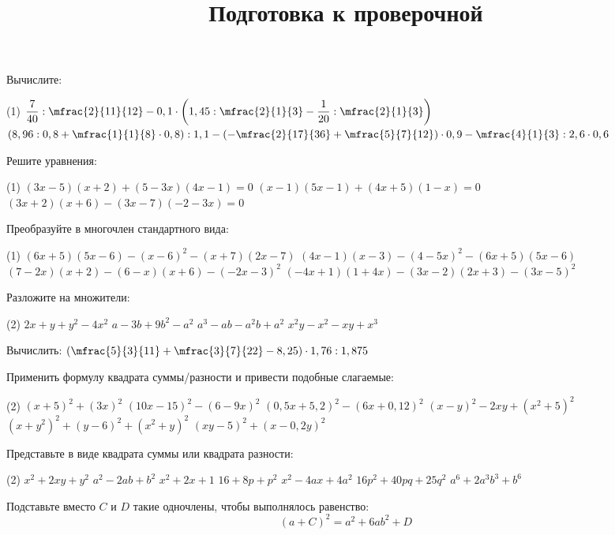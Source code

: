 \begin{class}[number=7]
	\title{Подготовка к проверочной}
	\begin{listofex}
		\item Вычислите:
		\begin{tasks}(1)
			\task \( \dfrac{7}{40} : \mfrac{2}{11}{12} - 0,1 \cdot \left( 1,45 : \mfrac{2}{1}{3} - \dfrac{1}{20} : \mfrac{2}{1}{3} \right) \)
			\task \( \left(  8,96 : 0,8 + \mfrac{1}{1}{8} \cdot 0,8 \right) : 1,1 - \left( - \mfrac{2}{17}{36} + \mfrac{5}{7}{12} \right) \cdot 0,9 - \mfrac{4}{1}{3} : 2,6 \cdot 0,6 \)
		\end{tasks}
		\item Решите уравнения:
		\begin{tasks}(1)
			\task \( (3x-5)(x+2)+(5-3x)(4x-1)=0 \)
			\task \( (x-1)(5x-1)+(4x+5)(1-x)=0 \)
			\task \( (3x+2)(x+6)-(3x-7)(-2-3x)=0 \)
		\end{tasks}
		\item Преобразуйте в многочлен стандартного вида:
		\begin{tasks}(1)
			\task \( (6x+5)(5x-6)-(x-6)^2-(x+7)(2x-7) \)
			\task \( (4x-1)(x-3)-(4-5x)^2-(6x+5)(5x-6) \)
			\task \( (7-2x)(x+2)-(6-x)(x+6)-(-2x-3)^2 \)
			\task \( (-4x+1)(1+4x)-(3x-2)(2x+3)-(3x-5)^2 \)
		\end{tasks}
		\item Разложите на множители:
		\begin{tasks}(2)
			\task \(2x+y+y^2-4x^2\)
			\task \(a-3b+9b^2-a^2\)
			\task \(a^3-ab-a^2b+a^2\)
			\task \(x^2y-x^2-xy+x^3\)
		\end{tasks}
	\end{listofex}
\end{class}

\begin{homework}[number=3]
	\begin{listofex}
		\item Вычислить: \( \left( \mfrac{5}{3}{11} + \mfrac{3}{7}{22} - 8,25 \right) \cdot 1,76 : 1,875 \)
		\item Применить формулу квадрата суммы/разности и привести подобные слагаемые:
		\begin{tasks}(2)
			\task \( (x+5)^2+(3x)^2 \)
			\task \( (10x-15)^2-(6-9x)^2 \)
			\task \( (0,5x+5,2)^2-(6x+0,12)^2 \)
			\task \( (x-y)^2-2xy+(x^2+5)^2 \)
			\task \( (x+y^2)^2 + (y-6)^2 + (x^2+y)^2 \)
			\task  \( (xy-5)^2 + (x-0,2y)^2 \)
		\end{tasks}
		\item Представьте в виде квадрата суммы или квадрата разности:
		\begin{tasks}(2)
			\task \( x^2+2xy+y^2 \)
			\task \( a^2-2ab+b^2 \)
			\task \( x^2+2x+1 \)
			\task \( 16+8p+p^2 \)
			\task \( x^2-4ax+4a^2 \)
			\task \( 16p^2+40pq+25q^2 \)
			\task \( a^6+2a^3b^3+b^6 \)
		\end{tasks}
		\item Подставьте вместо \( C \) и \( D \) такие одночлены, чтобы выполнялось равенство:
		\[ (a + C)^2 = a^2 + 6ab^2 + D \]
	\end{listofex}
\end{homework}


